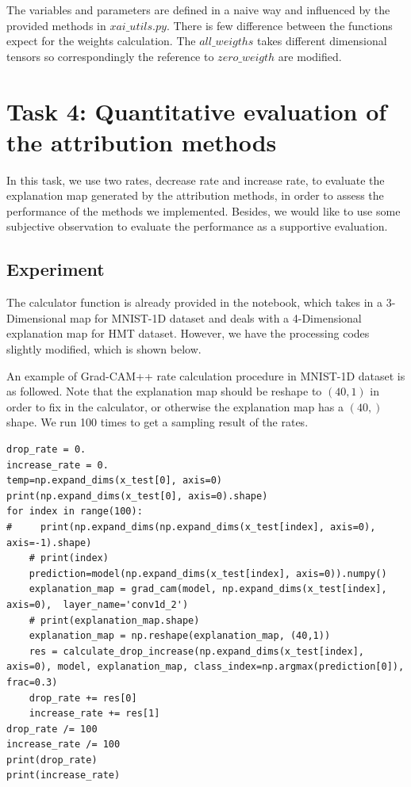 \documentclass[conference]{IEEEtran}
\begin{document}
The variables and parameters are defined in a naive way and influenced by the provided methods in $xai\_utils.py$. There is few difference between the functions expect for the weights calculation. The $all\_weigths$ takes different dimensional tensors so correspondingly the reference to $zero\_weigth$ are modified.

\section{Task 4: Quantitative evaluation of the attribution methods}

In this task, we use two rates, decrease rate and increase rate, to evaluate the explanation map generated by the attribution methods, in order to assess the performance of the methods we implemented. Besides, we would like to use some subjective observation to evaluate the performance as a supportive evaluation.

\subsection {Experiment}

The calculator function is already provided in the notebook, which takes in a 3-Dimensional map for MNIST-1D dataset and deals with a 4-Dimensional explanation map for HMT dataset. However, we have the processing codes slightly modified, which is shown below.

An example of Grad-CAM++ rate calculation procedure in MNIST-1D dataset is as followed. Note that the explanation map should be reshape to $(40,1)$ in order to fix in the calculator, or otherwise the explanation map has a $(40,)$ shape. We run 100 times to get a sampling result of the rates.

\begin{lstlisting}
drop_rate = 0.
increase_rate = 0.
temp=np.expand_dims(x_test[0], axis=0)
print(np.expand_dims(x_test[0], axis=0).shape)
for index in range(100):
#     print(np.expand_dims(np.expand_dims(x_test[index], axis=0), axis=-1).shape)
    # print(index)
    prediction=model(np.expand_dims(x_test[index], axis=0)).numpy()
    explanation_map = grad_cam(model, np.expand_dims(x_test[index], axis=0),  layer_name='conv1d_2')
    # print(explanation_map.shape)
    explanation_map = np.reshape(explanation_map, (40,1))
    res = calculate_drop_increase(np.expand_dims(x_test[index], axis=0), model, explanation_map, class_index=np.argmax(prediction[0]), frac=0.3)
    drop_rate += res[0]
    increase_rate += res[1]
drop_rate /= 100
increase_rate /= 100
print(drop_rate)
print(increase_rate)
\end{lstlisting}
\end{document}
